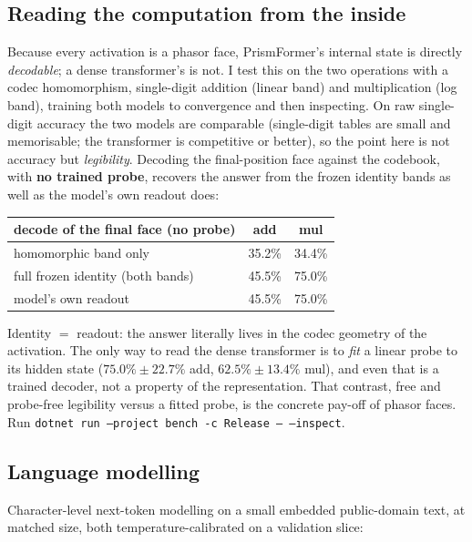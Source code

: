 \documentclass[11pt]{article}
\newcommand{\code}[1]{\texttt{#1}}
\begin{document}
\subsection{Reading the computation from the inside}\label{sec:inside}

Because every activation is a phasor face, PrismFormer's internal state is directly \emph{decodable}; a
dense transformer's is not. I test this on the two operations with a codec homomorphism, single-digit
addition (linear band) and multiplication (log band), training both models to convergence and then
inspecting. On raw single-digit accuracy the two models are comparable (single-digit tables are small
and memorisable; the transformer is competitive or better), so the point here is not accuracy but
\emph{legibility}. Decoding the final-position face against the codebook, with \textbf{no trained
probe}, recovers the answer from the frozen identity bands as well as the model's own readout does:

\begin{center}
\begin{tabular}{@{}lcc@{}}
\toprule
decode of the final face (no probe) & add & mul \\
\midrule
homomorphic band only              & 35.2\% & 34.4\% \\
full frozen identity (both bands)  & 45.5\% & 75.0\% \\
model's own readout                & 45.5\% & 75.0\% \\
\bottomrule
\end{tabular}
\end{center}

Identity $=$ readout: the answer literally lives in the codec geometry of the activation. The only way
to read the dense transformer is to \emph{fit} a linear probe to its hidden state
($75.0\% \pm 22.7\%$ add, $62.5\% \pm 13.4\%$ mul), and even that is a trained decoder, not a property
of the representation. That contrast, free and probe-free legibility versus a fitted probe, is the
concrete pay-off of phasor faces. Run \code{dotnet run --project bench -c Release -- --inspect}.

\subsection{Language modelling}

Character-level next-token modelling on a small embedded public-domain text, at matched size, both
temperature-calibrated on a validation slice:
\end{document}
